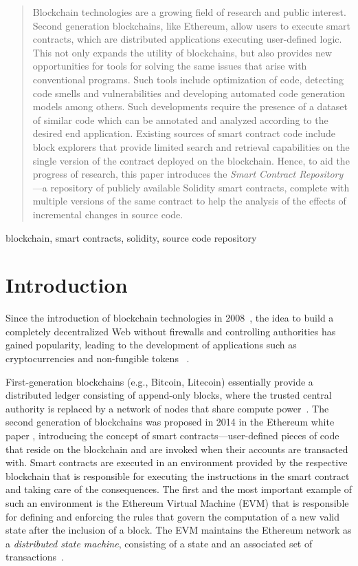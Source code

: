 \documentclass[10pt,conference]{IEEEtran}
\begin{document}
	\begin{abstract}
		Blockchain technologies are a growing field of research and public interest. Second generation blockchains, like Ethereum, allow users to execute smart contracts, which are distributed applications executing user-defined logic. This not only expands the utility of blockchains, but also provides new opportunities for tools for solving the same issues that arise with conventional programs. Such tools include optimization of code, detecting code smells and vulnerabilities and developing automated code generation models among others. Such developments require the presence of a dataset of similar code which can be annotated and analyzed according to the desired end application. Existing sources of smart contract code include block explorers that provide limited search and retrieval capabilities on the single version of the contract deployed on the blockchain. Hence, to aid the progress of research, this paper introduces the \textit{Smart Contract Repository}---a repository of publicly available Solidity smart contracts, complete with multiple versions of the same contract to help the analysis of the effects of incremental changes in source code.
	\end{abstract}
	
	\begin{IEEEkeywords}
		blockchain, smart contracts, solidity, source code repository
	\end{IEEEkeywords}
	
	\section{Introduction}
	\label{sec:intro}
	Since the introduction of blockchain technologies in 2008~\cite{bitcoinpaper}, the idea to build a completely decentralized Web without firewalls and controlling authorities has gained popularity, leading to the development of applications such as cryptocurrencies and non-fungible tokens ~\cite{crossblockchain}.
	
	First-generation blockchains (e.g., Bitcoin, Litecoin) essentially provide a distributed ledger consisting of append-only blocks, where the trusted central authority is replaced by a network of nodes that share compute power~\cite{blockchainsurvey}. The second generation of blockchains was proposed in 2014 in the Ethereum white paper \cite{ethpaper}, introducing the concept of smart contracts---user-defined pieces of code that reside on the blockchain and are invoked when their accounts are transacted with. Smart contracts are executed in an environment provided by the respective blockchain that is responsible for executing the instructions in the smart contract and taking care of the consequences. The first and the most important example of such an environment is the Ethereum Virtual Machine (EVM) that is responsible for defining and enforcing the rules that govern the computation of a new valid state after the inclusion of a block. The EVM maintains the Ethereum network as a \textit{distributed state machine}, consisting of a state and an associated set of transactions~\cite{wood2019ethereum}. %
	
\end{document}
